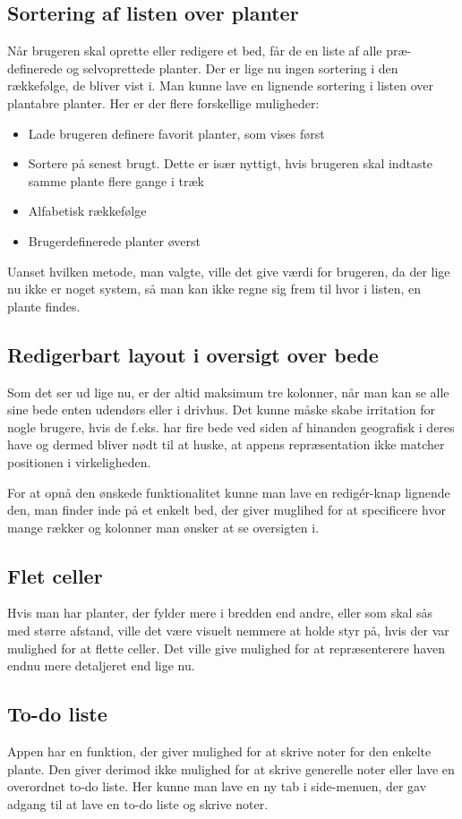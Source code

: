 \subsection{Sortering af listen over planter}
Når brugeren skal oprette eller redigere et bed, får de en liste af alle præ-definerede og selvoprettede planter. Der er lige nu ingen sortering i den rækkefølge, de bliver vist i.  Man kunne lave en lignende sortering i listen over plantabre planter. Her er der flere forskellige muligheder:
\begin{itemize}
   \item Lade brugeren definere favorit planter, som vises først
   \item Sortere på senest brugt. Dette er især nyttigt, hvis brugeren skal indtaste samme plante flere gange i træk
   \item Alfabetisk rækkefølge
   \item Brugerdefinerede planter øverst
\end{itemize}

Uanset hvilken metode, man valgte, ville det give værdi for brugeren, da der lige nu ikke er noget system, så man kan ikke regne sig frem til hvor i listen, en plante findes.

\subsection{Redigerbart layout i oversigt over bede}
Som det ser ud lige nu, er der altid maksimum tre kolonner, når man kan se alle sine bede enten udendørs eller i drivhus. Det kunne måske skabe irritation for nogle brugere, hvis de f.eks. har fire bede ved siden af hinanden geografisk i deres have og dermed bliver nødt til at huske, at appens repræsentation ikke matcher positionen i virkeligheden. 

For at opnå den ønskede funktionalitet kunne man lave en redigér-knap lignende den, man finder inde på et enkelt bed, der giver muglihed for at specificere hvor mange rækker og kolonner man ønsker at se oversigten i.

\subsection{Flet celler}
Hvis man har planter, der fylder mere i bredden end andre, eller som skal sås med større afstand, ville det være visuelt nemmere at holde styr på, hvis der var mulighed for at flette celler. Det ville give mulighed for at repræsenterere haven endnu mere detaljeret end lige nu.

\subsection{To-do liste}
Appen har en funktion, der giver mulighed for at skrive noter for den enkelte plante. Den giver derimod ikke mulighed for at skrive generelle noter eller lave en overordnet to-do liste. Her kunne man lave en ny tab i side-menuen, der gav adgang til at lave en to-do liste og skrive noter.
